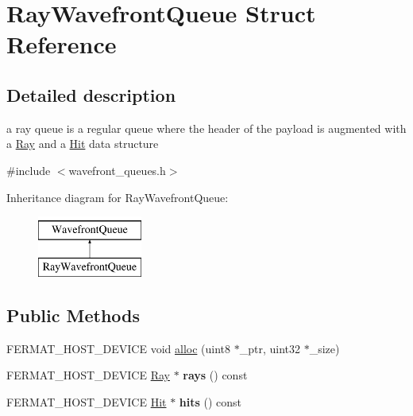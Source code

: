 \hypertarget{struct_ray_wavefront_queue}{}\section{Ray\+Wavefront\+Queue Struct Reference}
\label{struct_ray_wavefront_queue}


\subsection{Detailed description}
a ray queue is a regular queue where the header of the payload is augmented with a \hyperlink{struct_ray}{Ray} and a \hyperlink{struct_hit}{Hit} data structure 

{\ttfamily \#include $<$wavefront\+\_\+queues.\+h$>$}

Inheritance diagram for Ray\+Wavefront\+Queue\+:\begin{figure}[H]
\begin{center}
\leavevmode
\includegraphics[height=2.000000cm]{struct_ray_wavefront_queue}
\end{center}
\end{figure}
\subsection*{Public Methods}
\begin{DoxyCompactItemize}
\item 
F\+E\+R\+M\+A\+T\+\_\+\+H\+O\+S\+T\+\_\+\+D\+E\+V\+I\+CE void \hyperlink{struct_ray_wavefront_queue_a65fe540801f6b86491d12288ceeab0af}{alloc} (uint8 $\ast$\+\_\+ptr, uint32 $\ast$\+\_\+size)
\item 
\mbox{\label{struct_ray_wavefront_queue_adcb587089968aa849dbd2517856abc7d}} 
F\+E\+R\+M\+A\+T\+\_\+\+H\+O\+S\+T\+\_\+\+D\+E\+V\+I\+CE \hyperlink{struct_ray}{Ray} $\ast$ {\bfseries rays} () const
\item 
\mbox{\label{struct_ray_wavefront_queue_ab582c9be03fbca960e64d8e8b630914a}} 
F\+E\+R\+M\+A\+T\+\_\+\+H\+O\+S\+T\+\_\+\+D\+E\+V\+I\+CE \hyperlink{struct_hit}{Hit} $\ast$ {\bfseries hits} () const
\end{DoxyCompactItemize}
